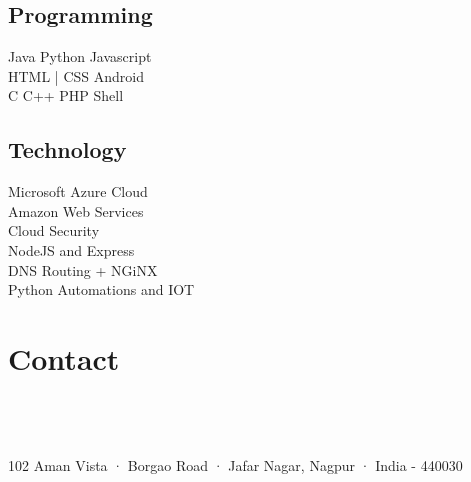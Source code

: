 \documentclass[]{deedy-resume-openfont}
\begin{document}
\begin{minipage}[t]{0.33\textwidth}
\subsection{Programming}
Java \textbullet{} Python \textbullet{} Javascript \\
\textbullet{} HTML | CSS \textbullet{} Android  \\ 
C \textbullet{} C++ \textbullet{} PHP \textbullet{} Shell \\


\vspace{9pt} %
\subsection{Technology}
\textbullet{} Microsoft Azure Cloud \\
\textbullet{} Amazon Web Services \\
\textbullet{} Cloud Security \\
\textbullet{} NodeJS and Express \\
\textbullet{} DNS Routing + NGiNX\\
\textbullet{} Python Automations and IOT \\




\section{Contact}
 \\
\\
\\

102 Aman Vista · Borgao Road · Jafar Nagar, Nagpur · India - 440030


\end{minipage}
\end{document}
